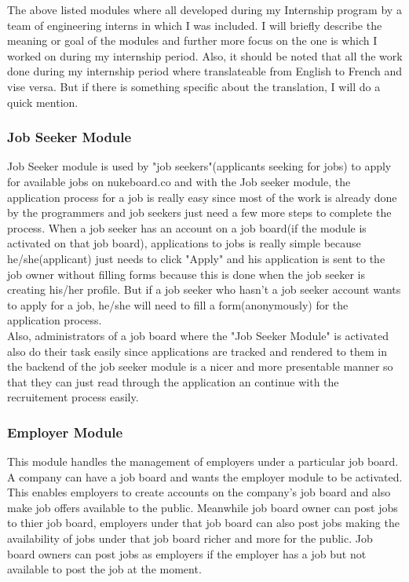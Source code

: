 The above listed modules where all developed during my Internship program by a team of engineering interns in which I was included. I will briefly describe the meaning or goal of the modules and further more focus on the one is which I worked on during my internship period. Also, it should be noted that all the work done during my internship period where translateable from English to French and vise versa. But if there is something specific about the translation, I will do a quick mention.

\subsubsection{Job Seeker Module}

Job Seeker module is used by "job seekers"(applicants seeking for jobs) to apply for available jobs on nukeboard.co and with the Job seeker module, the application process for a job is really easy since most of the work is already done by the programmers and job seekers just need a few more steps to complete the process. When a job seeker has an account on a job board(if the module is activated on that job board), applications to jobs is really simple because he/she(applicant) just needs to click "Apply" and his application is sent to the job owner without filling forms because this is done when the job seeker is creating his/her profile. But if a job seeker who hasn't a job seeker account wants to apply for a job, he/she will need to fill a form(anonymously) for the application process. \\

Also, administrators of a job board where the "Job Seeker Module" is activated also do their task easily since applications are tracked and rendered to them in the backend of the job seeker module is a nicer and more presentable manner so that they can just read through the application an continue with the recruitement process easily.

\subsubsection{Employer Module}

This module handles the management of employers under a particular job board. A company can have a job board and wants the employer module to be activated. This enables employers to create accounts on the company's job board and also make job offers available to the public. Meanwhile job board owner can post jobs to thier job board, employers under that job board can also post jobs making the availability of jobs under that job board richer and more for the public. Job board owners can post jobs as employers if the employer has a job but not available to post the job at the moment. \\

